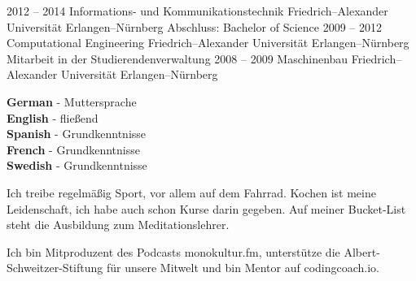 \documentclass[9pt]{developercv} %
\begin{document}


\begin{entrylist}
	\entry
		{2012 -- 2014}
		{Informations- und Kommunikationstechnik}
		{Friedrich–Alexander Universität Erlangen–Nürnberg}
		{Abschluss: Bachelor of Science}
	\entry
		{2009 -- 2012}
		{Computational Engineering}
		{Friedrich–Alexander Universität Erlangen–Nürnberg}
		{Mitarbeit in der Studierendenverwaltung}
	\entry
		{2008 -- 2009}
		{Maschinenbau}
		{Friedrich–Alexander Universität Erlangen–Nürnberg}
		{}
\end{entrylist}
\vspace{0.8cm}



\begin{minipage}[t]{0.3\textwidth}
	\vspace{-\baselineskip} %

	
	\textbf{German} - Muttersprache\\
	\textbf{English} - fließend\\
	\textbf{Spanish} - Grundkenntnisse\\
	\textbf{French} - Grundkenntnisse\\
	\textbf{Swedish} - Grundkenntnisse
\end{minipage}
\hfill
\begin{minipage}[t]{0.3\textwidth}
	\vspace{-\baselineskip} %
	
	Ich treibe regelmäßig Sport, vor allem auf dem Fahrrad.
  Kochen ist meine Leidenschaft, ich habe auch schon Kurse darin gegeben.
  Auf meiner Bucket-List steht die Ausbildung zum Meditationslehrer.
\end{minipage}
\hfill
\begin{minipage}[t]{0.3\textwidth}
	\vspace{-\baselineskip} %
	
  Ich bin Mitproduzent des Podcasts monokultur.fm, unterstütze die
  Albert-Schweitzer-Stiftung für unsere Mitwelt und bin Mentor auf
  codingcoach.io.
\end{minipage}



\end{document}
